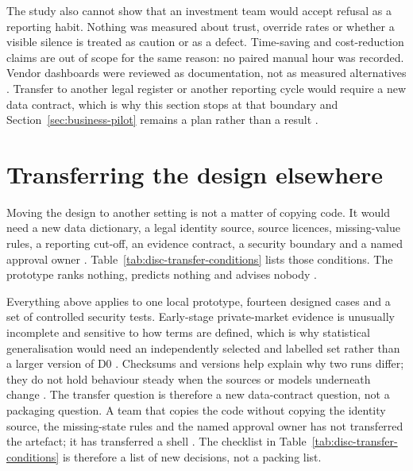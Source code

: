The study also cannot show that an investment team would accept refusal as a reporting habit.
Nothing was measured about trust, override rates or whether a visible silence is treated as
caution or as a defect. Time-saving and cost-reduction claims are out of scope for the same
reason: no paired manual hour was recorded. Vendor dashboards were reviewed as documentation,
not as measured alternatives \citep{visible2026investors,zapflow2026portfolio}. Transfer to
another legal register or another reporting cycle would require a new data contract, which is
why this section stops at that boundary and Section~\ref{sec:business-pilot} remains a plan
rather than a result
\citep{kaplan2016vcdata,britishbusinessbank2025equity}.

\section{Transferring the design elsewhere}

Moving the design to another setting is not a matter of copying code. It would need a new data
dictionary, a legal identity source, source licences, missing-value rules, a reporting cut-off, an
evidence contract, a security boundary and a named approval owner
\citep{gebru2021datasheets,nist2023airmf}. Table~\ref{tab:disc-transfer-conditions} lists those
conditions. The prototype ranks nothing, predicts nothing and advises nobody
\citep{fca2024promotions,hevner2004design}.

Everything above applies to one local prototype, fourteen designed cases and a set of controlled
security tests. Early-stage private-market evidence is unusually incomplete and sensitive to how terms
are defined, which is why statistical generalisation would need an independently selected and labelled
set rather than a larger version of D0
\citep{kaplan2016vcdata,britishbusinessbank2025equity,kapoor2023leakage}. Checksums and versions help
explain why two runs differ; they do not hold behaviour steady when the sources or models underneath
change \citep{gebru2021datasheets,nist2023airmf}. The transfer question is therefore a new
data-contract question, not a packaging question. A team that copies the code without copying the
identity source, the missing-state rules and the named approval owner has not transferred the
artefact; it has transferred a shell \citep{hevner2004design,peffers2007dsrm}. The checklist in
Table~\ref{tab:disc-transfer-conditions} is therefore a list of new decisions, not a packing list.


